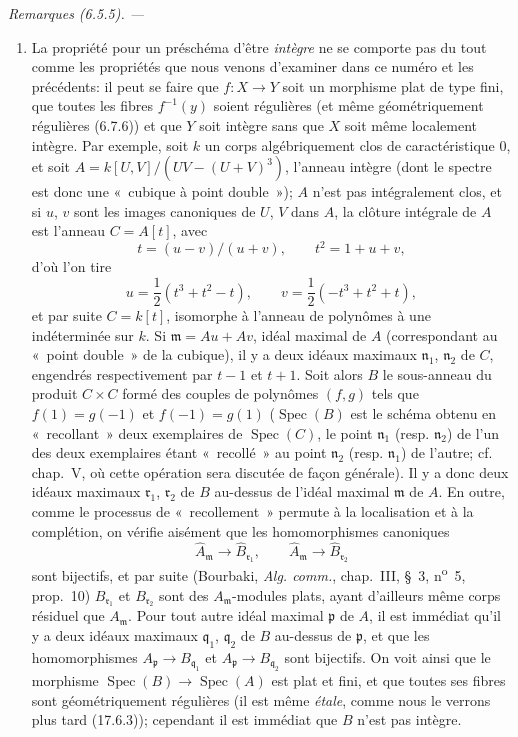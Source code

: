 \documentclass[10pt,oneside]{book}
\newenvironment{remarks}[1][]{%
  \par\medskip\noindent\itshape Remarques (#1). ---\ }{\par}
\begin{document}
\begin{remarks}[6.5.5]
\begin{enumerate}
\item[(ii)] La propriété pour un préschéma d'être \emph{intègre} ne se
comporte pas du tout comme les propriétés que nous venons d'examiner dans
ce numéro et les précédents: il peut se faire que
$f:X\to Y$ soit un morphisme plat de type fini, que toutes les fibres
$f^{-1}(y)$ soient régulières (et même géométriquement régulières (6.7.6))
et que $Y$ soit intègre sans que $X$ soit même localement intègre.
Par exemple, soit $k$ un corps algébriquement clos de caractéristique $0$,
et soit $A=k[U,V]/(UV-(U+V)^3)$, l'anneau intègre (dont le spectre est
donc une «~cubique à point double~»); $A$ n'est pas intégralement clos,
et si $u$, $v$ sont les images canoniques de $U$, $V$ dans $A$, la clôture
intégrale de $A$ est l'anneau $C=A[t]$, avec
\[
t=(u-v)/(u+v),\qquad t^2=1+u+v,
\]
d'où l'on tire
\[
u=\frac{1}{2}(t^3+t^2-t),\qquad
v=\frac{1}{2}(-t^3+t^2+t),
\]
et par suite $C=k[t]$, isomorphe à l'anneau de polynômes à une
indéterminée sur $k$. Si $\mathfrak m=Au+Av$, idéal maximal de $A$
(correspondant au «~point double~» de la cubique), il y a deux idéaux
maximaux $\mathfrak n_1$, $\mathfrak n_2$ de $C$, engendrés respectivement
par $t-1$ et $t+1$. Soit alors $B$ le sous-anneau du produit $C\times C$
formé des couples de polynômes $(f,g)$ tels que
$f(1)=g(-1)$ et $f(-1)=g(1)$
($\operatorname{Spec}(B)$ est le schéma obtenu en «~recollant~» deux
exemplaires de $\operatorname{Spec}(C)$, le point $\mathfrak n_1$
(resp. $\mathfrak n_2$) de l'un des deux exemplaires étant «~recollé~»
au point $\mathfrak n_2$ (resp. $\mathfrak n_1$) de l'autre; cf. chap.~V,
où cette opération sera discutée de façon générale). Il y a donc deux
idéaux maximaux $\mathfrak r_1$, $\mathfrak r_2$ de $B$ au-dessus de
l'idéal maximal $\mathfrak m$ de $A$. En outre, comme le processus de
«~recollement~» permute à la localisation et à la complétion, on vérifie
aisément que les homomorphismes canoniques
\[
\widehat A_{\mathfrak m}\to\widehat B_{\mathfrak r_1},
\qquad
\widehat A_{\mathfrak m}\to\widehat B_{\mathfrak r_2}
\]
sont bijectifs, et par suite (Bourbaki, \emph{Alg. comm.}, chap.~III,
\S~3, n\textsuperscript{o}~5, prop.~10) $B_{\mathfrak r_1}$ et
$B_{\mathfrak r_2}$ sont des $A_{\mathfrak m}$-modules plats, ayant
d'ailleurs même corps résiduel que $A_{\mathfrak m}$. Pour tout autre idéal
maximal $\mathfrak p$ de $A$, il est immédiat qu'il y a deux idéaux
maximaux $\mathfrak q_1$, $\mathfrak q_2$ de $B$ au-dessus de $\mathfrak p$,
et que les homomorphismes
$A_{\mathfrak p}\to B_{\mathfrak q_1}$ et
$A_{\mathfrak p}\to B_{\mathfrak q_2}$ sont bijectifs. On voit ainsi que
le morphisme $\operatorname{Spec}(B)\to\operatorname{Spec}(A)$ est plat
et fini, et que toutes ses fibres sont géométriquement régulières (il est
même \emph{\'etale}, comme nous le verrons plus tard (17.6.3)); cependant
il est immédiat que $B$ n'est pas intègre.
\end{enumerate}
\end{remarks}
\end{document}
